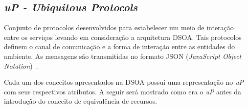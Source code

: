 \subsection{\emph{uP - Ubiquitous Protocols}}

Conjunto de protocolos desenvolvidos para estabelecer um meio de interação entre os serviços levando em consideração a arquitetura DSOA. Tais protocolos definem o canal de comunicação e a forma de interação entre as entidades do ambiente. As mensagens são transmitidas no formato JSON (\emph{JavaScript Object Notation})~\cite{json}.

\begin{comment}
, que utiliza a codificação UTF-8~\cite{utf8}, que foi escolhido por ser um formato estruturado, leve e independente de plataforma. O JSON foi utilizado ante o XML, pois possui menor tamanho de mensagens e esse fator pode ser decisivo em um ambiente com diversos dipositivos com capacidades computacionais diferentes e possivelmente reduzidas. Dessa forma a limitação dos dispositivos é minimizada e exclui a necessidade de uma rede para tratamento dessas mensagens.
\end{comment}

Cada um dos conceitos apresentados na DSOA possui uma representação no \emph{uP} com seus respectivos atributos. A seguir será mostrado como era o \emph{uP} antes da introdução do conceito de equivalência de recursos.


